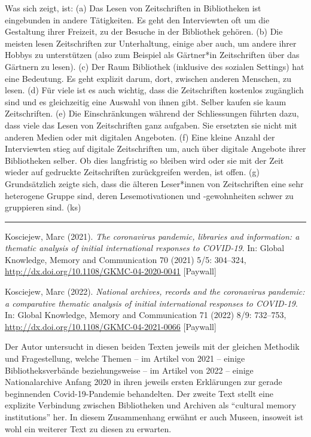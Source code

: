 \documentclass[a4paper,
fontsize=11pt,
oneside,
numbers=noperiodatend,
parskip=half-,
bibliography=totoc,
final
]{scrartcl}
\begin{document}
Was sich zeigt, ist: (a) Das Lesen von Zeitschriften in Bibliotheken ist
eingebunden in andere Tätigkeiten. Es geht den Interviewten oft um die
Gestaltung ihrer Freizeit, zu der Besuche in der Bibliothek gehören. (b)
Die meisten lesen Zeitschriften zur Unterhaltung, einige aber auch, um
andere ihrer Hobbys zu unterstützen (also zum Beispiel als Gärtner*in
Zeitschriften über das Gärtnern zu lesen). (c) Der Raum Bibliothek
(inklusive des sozialen Settings) hat eine Bedeutung. Es geht explizit
darum, dort, zwischen anderen Menschen, zu lesen. (d) Für viele ist es
auch wichtig, dass die Zeitschriften kostenlos zugänglich sind und es
gleichzeitig eine Auswahl von ihnen gibt. Selber kaufen sie kaum
Zeitschriften. (e) Die Einschränkungen während der Schliessungen führten
dazu, dass viele das Lesen von Zeitschriften ganz aufgaben. Sie
ersetzten sie nicht mit anderen Medien oder mit digitalen Angeboten. (f)
Eine kleine Anzahl der Interviewten stieg auf digitale Zeitschriften um,
auch über digitale Angebote ihrer Bibliotheken selber. Ob dies
langfristig so bleiben wird oder sie mit der Zeit wieder auf gedruckte
Zeitschriften zurückgreifen werden, ist offen. (g) Grundsätzlich zeigte
sich, dass die älteren Leser*innen von Zeitschriften eine sehr
heterogene Gruppe sind, deren Lesemotivationen und -gewohnheiten schwer
zu gruppieren sind. (ks)

\begin{center}\rule{0.5\linewidth}{0.5pt}\end{center}

Kosciejew, Marc (2021). \emph{The coronavirus pandemic, libraries and
information: a thematic analysis of initial international responses to
COVID-19}. In: Global Knowledge, Memory and Communication 70 (2021) 5/5:
304--324, \url{http://dx.doi.org/10.1108/GKMC-04-2020-0041}
{[}Paywall{]}

Kosciejew, Marc (2022). \emph{National archives, records and the
coronavirus pandemic: a comparative thematic analysis of initial
international responses to COVID-19}. In: Global Knowledge, Memory and
Communication 71 (2022) 8/9: 732--753,
\url{http://dx.doi.org/10.1108/GKMC-04-2021-0066} {[}Paywall{]}

Der Autor untersucht in diesen beiden Texten jeweils mit der gleichen
Methodik und Fragestellung, welche Themen -- im Artikel von 2021 --
einige Bibliotheksverbände beziehungsweise -- im Artikel von 2022 --
einige Nationalarchive Anfang 2020 in ihren jeweils ersten Erklärungen
zur gerade beginnenden Covid-19-Pandemie behandelten. Der zweite Text
stellt eine explizite Verbindung zwischen Bibliotheken und Archiven als
\enquote{cultural memory institutions} her. In diesem Zusammenhang
erwähnt er auch Museen, insoweit ist wohl ein weiterer Text zu diesen zu
erwarten.
\end{document}

